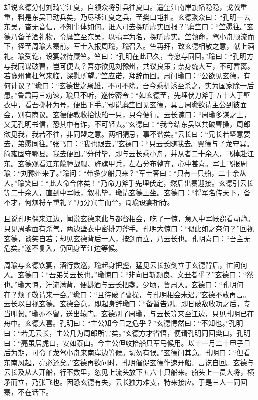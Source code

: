 却说玄德分付刘琦守江夏，自领众将引兵往夏口。遥望江南岸旗幡隐隐，戈戟重重，料是东吴已动兵矣，乃尽移江夏之兵，至樊口屯扎。玄德聚众曰：“孔明一去东吴，杳无音信，不知事体如何。谁人可去探听虚实回报？”糜竺曰：“竺愿往。”玄德乃备羊酒礼物，令糜竺至东吴，以犒军为名，探听虚实。竺领命，驾小舟顺流而下，径至周瑜大寨前。军士入报周瑜，瑜召入。竺再拜，致玄德相敬之意，献上酒礼。瑜受讫，设宴款待糜竺。竺曰：“孔明在此已久，今愿与同回。”瑜曰：“孔明方与我同谋破曹，岂可便去？吾亦欲见刘豫州，共议良策；奈身统大军，不可暂离。若豫州肯枉驾来临，深慰所望。”竺应诺，拜辞而回。肃问瑜曰：“公欲见玄德，有何计议？”瑜曰：“玄德世之枭雄，不可不除。吾今乘机诱至杀之，实为国家除一后患。”鲁肃再三劝谏，瑜只不听，遂传密令：“如玄德至，先埋伏刀斧手五十人于壁衣中，看吾掷杯为号，便出下手。”却说糜竺回见玄德，具言周瑜欲请主公到彼面会，别有商议。玄德便教收拾快船一只，只今便行。云长谏曰：“周瑜多谋之士，又无孔明书信，恐其中有诈，不可轻去。”玄德曰：“我今结东吴以共破曹操，周郎欲见我，我若不往，非同盟之意。两相猜忌，事不谐矣。”云长曰：“兄长若坚意要去，弟愿同往。”张飞曰：“我也跟去。”玄德曰：“只云长随我去。翼德与子龙守寨。简雍固守鄂县。我去便回。”分付毕，即与云长乘小舟，并从者二十余人，飞棹赴江东。玄德观看江东艨艟战舰、旌旗甲兵，左右分布整齐，心中甚喜。军士飞报周瑜：“刘豫州来了。”瑜问：“带多少船只来？”军士答曰：“只有一只船，二十余从人。”瑜笑曰：“此人命合体矣！”乃命刀斧手先埋伏定，然后出寨迎接。玄德引云长等二十余人，直到中军帐，叙礼毕，瑜请玄德上坐。玄德曰：“将军名传天下，备不才，何烦将军重礼？”乃分宾主而坐。周瑜设宴相待。

且说孔明偶来江边，闻说玄德来此与都督相会，吃了一惊，急入中军帐窃看动静。只见周瑜面有杀气，两边壁衣中密排刀斧手。孔明大惊曰：“似此如之奈何？”回视玄德，谈笑自若；却见玄德背后一人，按剑而立，乃云长也。孔明喜曰：“吾主无危矣。”遂不复入，仍回身至江边等候。

周瑜与玄德饮宴，酒行数巡，瑜起身把盏，猛见云长按剑立于玄德背后，忙问何人。玄德曰：“吾弟关云长也。”瑜惊曰：“非向日斩颜良、文丑者乎？”玄德曰：“然也。”瑜大惊，汗流满背，便斟酒与云长把盏。少顷，鲁肃入。玄德曰：“孔明何在？烦子敬请来一会。”瑜曰：“且待破了曹操，与孔明相会未迟。”玄德不敢再言。云长以目视玄德。玄德会意，即起身辞瑜曰：“备暂告别。即日破敌收功之后，专当叩贺。”瑜亦不留，送出辕门。玄德别了周瑜，与云长等来至江边，只见孔明已在舟中。玄德大喜。孔明曰：“主公知今日之危乎？”玄德愕然曰：“不知也。”孔明曰：“若无云长，主公几为周郎所害矣。”玄德方才省悟，便请孔明同回樊口。孔明曰：“亮虽居虎口，安如泰山。今主公但收拾船只军马候用。以十一月二十甲子日后为期，可令子龙驾小舟来南岸边等候。切勿有误。”玄德问其意。孔明曰：“但看东南风起，亮必还矣。”玄德再欲问时，孔明催促玄德作速开船。言讫自回。玄德与云长及从人开船，行不数里，忽见上流头放下五六十只船来。船头上一员大将，横矛而立，乃张飞也。因恐玄德有失，云长独力难支，特来接应。于是三人一同回寨，不在话下。

